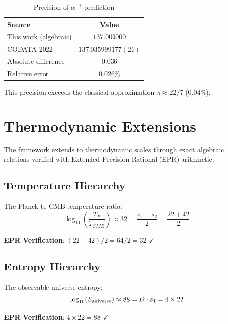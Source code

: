 \documentclass[11pt,a4paper]{article}
\begin{document}
\begin{table}[h]
\centering
\caption{Precision of $\alpha^{-1}$ prediction}
\label{tab:alpha}
\begin{tabular}{lc}
\hline
Source & Value \\
\hline
This work (algebraic) & $137.000000$ \\
CODATA 2022~\cite{codata2022} & $137.035999177(21)$ \\
Absolute difference & $0.036$ \\
Relative error & $0.026\%$ \\
\hline
\end{tabular}
\end{table}

This precision exceeds the classical approximation $\pi \approx 22/7$ (0.04\%).

\section{Thermodynamic Extensions}

The framework extends to thermodynamic scales through exact algebraic relations 
verified with Extended Precision Rational (EPR) arithmetic.

\subsection{Temperature Hierarchy}

The Planck-to-CMB temperature ratio:
\begin{equation}
\log_{10}\left(\frac{T_P}{T_{CMB}}\right) \approx 32 = \frac{s_1 + s_2}{2} = \frac{22 + 42}{2}
\label{eq:temp_ratio}
\end{equation}

\textbf{EPR Verification}: $(22 + 42)/2 = 64/2 = 32$ \hfill $\checkmark$

\subsection{Entropy Hierarchy}

The observable universe entropy:
\begin{equation}
\log_{10}(S_{\rm universe}) \approx 88 = D \cdot s_1 = 4 \times 22
\label{eq:entropy}
\end{equation}

\textbf{EPR Verification}: $4 \times 22 = 88$ \hfill $\checkmark$
\end{document}

